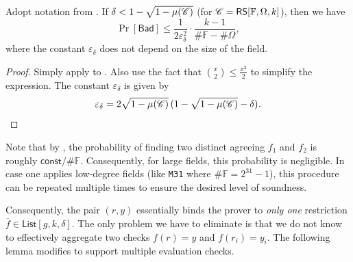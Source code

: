 \documentclass[../../book]{subfiles}
\begin{document}
\begin{corollary}\label{cor:iopp-bad-event}
  Adopt notation from . 
  If $\delta < 1-\sqrt{1-\mu(\mathscr{C})}$ (for $\mathscr{C}=\mathsf{RS}[\mathbb{F},\Omega,k]$), then we have
    \begin{equation*}
      \Pr\left[ \mathsf{Bad} \right] \leq \frac{1}{2\varepsilon_{\delta}^2} \cdot \frac{k-1}{\#\mathbb{F} - \#\Omega},
    \end{equation*}
    where the constant $\varepsilon_{\delta}$ does not depend on the size of the field.
\end{corollary}

\begin{proof}
  Simply apply  to . 
  Also use the fact that $\binom{x}{2} \leq \frac{x^2}{2}$ to simplify the expression.
  The constant $\varepsilon_{\delta}$ is given by 
  \begin{equation*}
    \varepsilon_{\delta} = 2\sqrt{1-\mu(\mathscr{C})}\,(1-\sqrt{1-\mu(\mathscr{C})}-\delta).
  \end{equation*}
\end{proof}

\begin{remark}
  Note that by , the probability of finding two distinct agreeing $f_1$ and $f_2$ is roughly $\mathsf{const}/\#\mathbb{F}$.
  Consequently, for large fields, this probability is negligible.
  In case one applies low-degree fields (like \texttt{M31} where $\#\mathbb{F} = 2^{31}-1$), this procedure can be repeated multiple times to ensure the desired level of soundness.
\end{remark}

Consequently, the pair $(r,y)$ essentially binds the prover to \emph{only one} restriction $\overline{f} \in \mathsf{List}[g,k,\delta]$.
The only problem we have to eliminate is that we do not know to effectively aggregate two checks $f(r)=y$ and $f(r_i)=y_i$.
The following lemma modifies  to support multiple evaluation checks.
\end{document}
